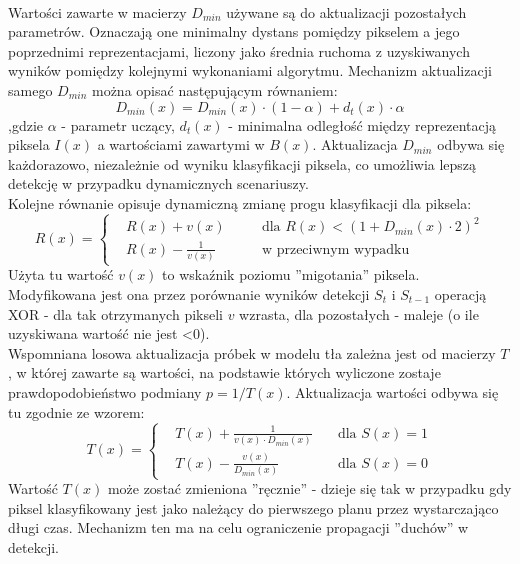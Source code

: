 \paragraph{}
Wartości zawarte w macierzy $D_{min}$ używane są do aktualizacji pozostałych parametrów. Oznaczają one minimalny dystans pomiędzy pikselem a jego poprzednimi reprezentacjami, liczony jako średnia ruchoma z uzyskiwanych wyników pomiędzy kolejnymi wykonaniami algorytmu. Mechanizm aktualizacji samego $D_{min}$ można opisać następującym równaniem:
\begin{equation}
D_{min}(x) = D_{min}(x)\cdot (1-\alpha)+d_{t}(x)\cdot \alpha
\end{equation}
,gdzie $\alpha$ - parametr uczący, $d_{t}(x)$ - minimalna odległość między reprezentacją piksela $I(x)$ a wartościami zawartymi w $B(x)$. Aktualizacja $D_{min}$ odbywa się każdorazowo, niezależnie od wyniku klasyfikacji piksela, co umożliwia lepszą detekcję w przypadku dynamicznych scenariuszy.\\
Kolejne równanie opisuje dynamiczną zmianę progu klasyfikacji dla piksela:
\begin{equation}
R(x) = \left\{
\begin{split}
&R(x) + v(x) & \quad &\text{dla $R(x)<(1+D_{min}(x)\cdot 2)^2$} \\
&R(x) - \frac{1}{v(x)} & \quad &\text{w przeciwnym wypadku}
\end{split}
\right.
\end{equation}
Użyta tu wartość $v(x)$ to wskaźnik poziomu ''migotania'' piksela. Modyfikowana jest ona przez porównanie wyników detekcji $S_{t}$ i $S_{t-1}$ operacją XOR - dla tak otrzymanych pikseli $v$ wzrasta, dla pozostałych - maleje (o ile uzyskiwana wartość nie jest <0). \\
Wspomniana losowa aktualizacja próbek w modelu tła zależna jest od macierzy $T$, w której zawarte są wartości, na podstawie których wyliczone zostaje prawdopodobieństwo podmiany $p = 1/T(x)$. Aktualizacja wartości odbywa się tu zgodnie ze wzorem:
\begin{equation}
T(x) = \left\{
\begin{split}
&T(x) + \frac{1}{v(x)\cdot D_{min}(x)} & \quad \text{dla $S(x)=1$} \\
&T(x) - \frac{v(x)}{D_{min}(x)} & \quad \text{dla $S(x)=0$}
\end{split}
\right.
\end{equation}
Wartość $T(x)$ może zostać zmieniona ''ręcznie'' - dzieje się tak w przypadku gdy piksel klasyfikowany jest jako należący do pierwszego planu przez wystarczająco długi czas. Mechanizm ten ma na celu ograniczenie propagacji ''duchów'' w detekcji.

